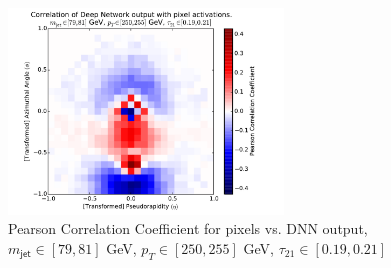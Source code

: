 \begin{figure}[htbp]
  \centering
  \includegraphics[width=0.65\textwidth]{figures/pixel-activations-corr-benwindow.pdf}
  \caption{Pearson Correlation Coefficient for pixels vs. DNN output, $m_{\mathsf{jet}}\in [79, 81]$ GeV, $p_{T}\in [250, 255]$ GeV, $\tau_{21}\in[0.19, 0.21]$}
  \label{fig:corrWindow}
\end{figure}

%






\clearpage
\newpage

